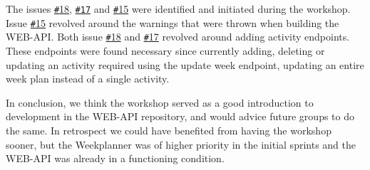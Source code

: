 The issues \href{https://github.com/aau-giraf/web-api/issues/18}{\texttt{\#}18}, \href{https://github.com/aau-giraf/web-api/issues/17}{\texttt{\#17}} and \href{https://github.com/aau-giraf/web-api/issues/15}{\texttt{\#}15} were identified and initiated during the workshop.
Issue \href{https://github.com/aau-giraf/web-api/issues/15}{\texttt{\#}15} revolved around the warnings that were thrown when building the WEB-API.
Both issue \href{https://github.com/aau-giraf/web-api/issues/18}{\texttt{\#}18} and \href{https://github.com/aau-giraf/web-api/issues/17}{\texttt{\#}17} revolved around adding activity endpoints.
These endpoints were found necessary since currently adding, deleting or updating an activity required using the update week endpoint, updating an entire week plan instead of a single activity. 
 
In conclusion, we think the workshop served as a good introduction to development in the WEB-API repository, and would advice future groups to do the same.
In retrospect we could have benefited from having the workshop sooner, but the Weekplanner was of higher priority in the initial sprints and the WEB-API was already in a functioning condition.

